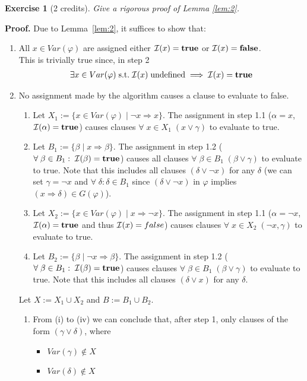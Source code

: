 \documentclass [11pt]{article}
\newtheorem{exercise}{Exercise}
\newcommand{\Ra}{\Rightarrow}
\renewcommand{\phi}{\varphi}
\def\II{{\cal I}}
\newcommand{\True}{\mathbf{true}}
\newcommand{\False}{\mathbf{false}}
\def\ox{\neg x}
\def\a{\alpha}
\def\b{\beta}
\def\g{\gamma}
\def\d{\delta}
\renewcommand{\em}{\rm}
\begin{document}
\noindent
\begin{exercise}[2 credits]
{\em Give a rigorous proof of Lemma \ref{lem:2}.
}%
\end{exercise}
\noindent
{\bf Proof.} Due to Lemma~\ref{lem:2}, it suffices to show that:
\begin{enumerate}
\item All $x \in Var(\phi)$ are assigned either $\II(x) = \True$ or $\II(x) = \False$. \\
This is trivially true since, in step 2
\begin{align}
\exists x \in Var(\phi)\; \mathrm{s.t.}\; \II(x)\; \mathrm{undefined} \implies \II(x) = \True
\end{align}
\item No assignment made by the algorithm causes a clause to evaluate to false.
\begin{enumerate}[label=(\roman*)]
\item Let $X_1 := \{x\in Var(\phi)\; |\; \ox \Ra x \}$. The assignment in step 1.1 ($\a = x$, $\II(\a) = \True$) causes clauses $\forall\; x \in X_1\;(x \lor \gamma)$ to evaluate to true. 
\item Let $B_1 := \{\b\; |\; x \Ra \b \}$. The assignment in step 1.2 ($\forall\; \b \in B_1: \;\II(\b) = \True$) causes all clauses $\forall\; \b \in B_1\;(\b \lor \gamma)$ to evaluate to true. Note that this includes all clauses $(\d \lor \ox)$ for any $\d$ (we can set $\g = \ox$ and $\forall\;\d: \d \in B_1$ since $(\d \lor \ox)$ in $\phi$ implies $(x\Ra \d) \in G(\phi)$).
\item Let $X_2 := \{x\in Var(\phi)\; |\; x \Ra \ox \}$. The assignment in step 1.1 ($\a = \ox$, $\II(\a) = \True$ and thus $\II(x) = false$) causes clauses $\forall\; x \in X_2\;(\ox, \gamma)$ to evaluate to true.
\item Let $B_2 := \{\b\; |\; \ox \Ra \b \}$. The assignment in step 1.2 ($\forall\; \b \in B_1: \;\II(\b) = \True$) causes clauses $\forall\; \b \in B_1\;(\b \lor \gamma)$ to evaluate to true. Note that this includes all clauses $(\d \lor x)$ for any $\d$.
\end{enumerate}
Let $X := X_1 \cup X_2$ and $B := B_1 \cup B_2$.
\begin{enumerate}[label=(\roman*), resume]
\item From (i) to (iv) we can conclude that, after step 1, only clauses of the form $(\g \lor \d)$, where 
\begin{itemize}
\item $Var(\g) \not \in X$
\item $Var(\d) \not \in X$

\end{itemize}
\end{enumerate}
\end{enumerate}
\end{document}

